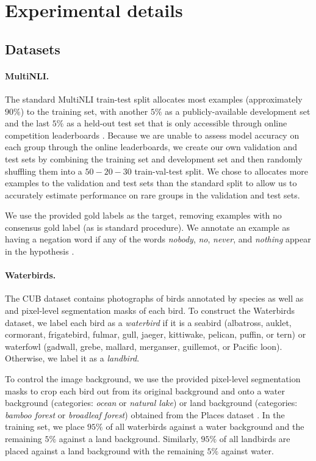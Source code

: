 \section{Experimental details}\label{sec:expt_details}

\subsection{Datasets}\label{sec:dataset_details}

\paragraph{MultiNLI.}
The standard MultiNLI train-test split allocates most examples (approximately $90\%$) to the training set,
with another $5\%$ as a publicly-available development set and the last $5\%$ as a held-out test set
that is only accessible through online competition leaderboards \citep{williams2018broad}.
Because we are unable to assess model accuracy on each group through the online leaderboards, we create our own validation and test sets by combining the training set and development set and then randomly shuffling them into a $50-20-30$ train-val-test split.
We chose to allocates more examples to the validation and test sets than the standard split to allow us to accurately estimate performance on rare groups in the validation and test sets.

We use the provided gold labels as the target, removing examples with no consensus gold label
(as is standard procedure). We annotate an example as having a negation word if any of the
words \emph{nobody}, \emph{no}, \emph{never}, and \emph{nothing} appear in the hypothesis
\citep{gururangan2018annotation}.

\paragraph{Waterbirds.}
The CUB dataset \citep{wah2011cub} contains photographs of birds annotated by species as well as and pixel-level segmentation masks of each bird.
To construct the Waterbirds dataset, we label each bird as a \emph{waterbird}
if it is a seabird (albatross, auklet, cormorant, frigatebird, fulmar, gull, jaeger, kittiwake, pelican, puffin, or tern) or waterfowl (gadwall, grebe, mallard, merganser, guillemot, or Pacific loon). Otherwise, we label it as a \emph{landbird}.

To control the image background, we use the provided pixel-level segmentation masks
to crop each bird out from its original background and onto a
water background (categories: \emph{ocean} or \emph{natural lake}) or
land background (categories: \emph{bamboo forest} or \emph{broadleaf forest})
obtained from the Places dataset \citep{zhou2017places}.
In the training set, we place $95\%$ of all waterbirds against a water background
and the remaining $5\%$ against a land background.
Similarly, $95\%$ of all landbirds are placed against a land background
with the remaining $5\%$ against water.

